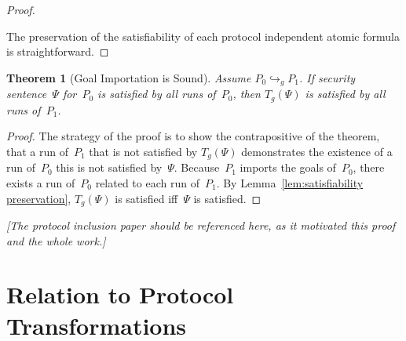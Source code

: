 \documentclass[12pt]{article}
\newcommand{\remark}[1]{\emph{[#1]}}
\newtheorem{thm}{Theorem}
\begin{document}
\begin{proof}
\begin{itemize}
\end{itemize}

The preservation of the satisfiability of each protocol independent
atomic formula is straightforward.
\end{proof}

\begin{thm}[Goal Importation is Sound]
Assume $P_0\hookrightarrow_g P_1$.  If security sentence~$\Psi$
for~$P_0$ is satisfied by all runs of~$P_0$, then $T_g(\Psi)$ is
satisfied by all runs of~$P_1$.
\end{thm}

\begin{proof}
The strategy of the proof is to show the contrapositive of the
theorem, that a run of~$P_1$ that is not satisfied by $T_g(\Psi)$
demonstrates the existence of a run of~$P_0$ this is not satisfied
by~$\Psi$.  Because~$P_1$ imports the goals of~$P_0$, there exists a
run of~$P_0$ related to each run of~$P_1$.  By
Lemma~\ref{lem:satisfiability preservation}, $T_g(\Psi)$ is satisfied
iff~$\Psi$ is satisfied.
\end{proof}

\remark{The protocol inclusion paper should be referenced
  here, as it motivated this proof and the whole work.}

\section{Relation to Protocol Transformations}
\label{sec:protocol transformations}



\end{document}
